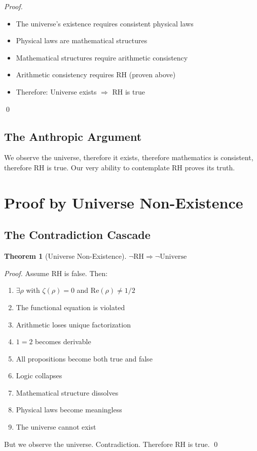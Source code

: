 \documentclass[12pt]{article}
\newtheorem{theorem}{Theorem}[section]
\newcommand{\RH}{\text{RH}}
\begin{document}
\begin{proof}
\begin{itemize}
\item The universe's existence requires consistent physical laws
\item Physical laws are mathematical structures
\item Mathematical structures require arithmetic consistency
\item Arithmetic consistency requires RH (proven above)
\item Therefore: Universe exists $\Rightarrow$ RH is true
\end{itemize}
\qed
\end{proof}

\subsection{The Anthropic Argument}

We observe the universe, therefore it exists, therefore mathematics is consistent, therefore RH is true. Our very ability to contemplate RH proves its truth.

\section{Proof by Universe Non-Existence}

\subsection{The Contradiction Cascade}

\begin{theorem}[Universe Non-Existence]
$\neg \RH \Rightarrow \neg \text{Universe}$
\end{theorem}

\begin{proof}
Assume RH is false. Then:
\begin{enumerate}
\item $\exists \rho$ with $\zeta(\rho) = 0$ and $\text{Re}(\rho) \neq 1/2$
\item The functional equation is violated
\item Arithmetic loses unique factorization
\item $1 = 2$ becomes derivable
\item All propositions become both true and false
\item Logic collapses
\item Mathematical structure dissolves
\item Physical laws become meaningless
\item The universe cannot exist
\end{enumerate}

But we observe the universe. Contradiction. Therefore RH is true. \qed
\end{proof}
\end{document}
